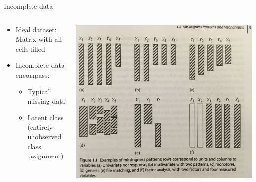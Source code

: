 \documentclass[dvipdfmx,bigger,aspectratio=169]{beamer}
\begin{document}
\begin{frame}[label={sec:org5091263}]{Incomplete data}
\begin{columns}
\begin{column}{0.45\columnwidth}
\begin{itemize}
\item Ideal dataset: Matrix with all cells filled
\item Incomplete data encompass:
\begin{itemize}
\item Typical missing data
\item Latent class (entirely unobserved class assignment)
\end{itemize}
\end{itemize}
\end{column}

\begin{column}{0.45\columnwidth}
\begin{center}
\includegraphics[page=1,keepaspectratio,width=\textwidth,height=0.75\textheight]{./source/missing_patterns.png}
\end{center}
\scriptsize \cite{littleStatisticalAnalysisMissing2019} \normalsize
\end{column}
\end{columns}
\end{frame}
\end{document}
